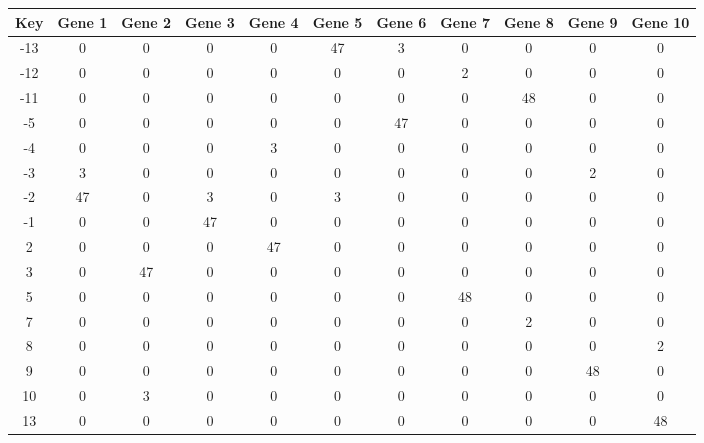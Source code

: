 \begin{tabular}{|c|c|c|c|c|c|c|c|c|c|c|}
\hline
Key & Gene 1 & Gene 2 & Gene 3 & Gene 4 & Gene 5 & Gene 6 & Gene 7 & Gene 8 & Gene 9 & Gene 10 \\
\hline
-13 & 0 & 0 & 0 & 0 & 47 & 3 & 0 & 0 & 0 & 0 \\
-12 & 0 & 0 & 0 & 0 & 0 & 0 & 2 & 0 & 0 & 0 \\
-11 & 0 & 0 & 0 & 0 & 0 & 0 & 0 & 48 & 0 & 0 \\
-5 & 0 & 0 & 0 & 0 & 0 & 47 & 0 & 0 & 0 & 0 \\
-4 & 0 & 0 & 0 & 3 & 0 & 0 & 0 & 0 & 0 & 0 \\
-3 & 3 & 0 & 0 & 0 & 0 & 0 & 0 & 0 & 2 & 0 \\
-2 & 47 & 0 & 3 & 0 & 3 & 0 & 0 & 0 & 0 & 0 \\
-1 & 0 & 0 & 47 & 0 & 0 & 0 & 0 & 0 & 0 & 0 \\
2 & 0 & 0 & 0 & 47 & 0 & 0 & 0 & 0 & 0 & 0 \\
3 & 0 & 47 & 0 & 0 & 0 & 0 & 0 & 0 & 0 & 0 \\
5 & 0 & 0 & 0 & 0 & 0 & 0 & 48 & 0 & 0 & 0 \\
7 & 0 & 0 & 0 & 0 & 0 & 0 & 0 & 2 & 0 & 0 \\
8 & 0 & 0 & 0 & 0 & 0 & 0 & 0 & 0 & 0 & 2 \\
9 & 0 & 0 & 0 & 0 & 0 & 0 & 0 & 0 & 48 & 0 \\
10 & 0 & 3 & 0 & 0 & 0 & 0 & 0 & 0 & 0 & 0 \\
13 & 0 & 0 & 0 & 0 & 0 & 0 & 0 & 0 & 0 & 48 \\
\hline
\end{tabular}